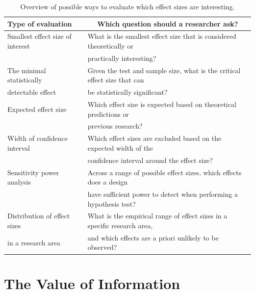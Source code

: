 \documentclass[
  english,
  ,jou, a4paper,floatsintext]{apa6}
\begin{document}
\begin{table}[tbp]

\begin{center}
\begin{threeparttable}

\caption{\label{tab:table-effect-eval}Overview of possible ways to evaluate which effect sizes are interesting.}

\begin{tabular}{ll}
\toprule
Type of evaluation & \multicolumn{1}{c}{Which question should a researcher ask?}\\
\midrule
Smallest effect size of interest & What is the smallest effect size that is considered theoretically or\\
 & practically interesting?\\ \midrule
The minimal statistically & Given the test and sample size, what is the critical effect size that can\\
detectable effect & be statistically significant?\\ \midrule
Expected effect size & Which effect size is expected based on theoretical predictions or\\
 & previous research?\\ \midrule
Width of confidence interval & Which effect sizes are excluded based on the expected width of the\\
 & confidence interval around the effect size?\\ \midrule
Sensitivity power analysis & Across a range of possible effect sizes, which effects does a design\\
 & have sufficient power to detect when performing a hypothesis test?\\ \midrule
Distribution of effect sizes & What is the empirical range of effect sizes in a specific research area,\\
in a research area & and which effects are a priori unlikely to be observed?\\
\bottomrule
\end{tabular}

\end{threeparttable}
\end{center}

\end{table}

\hypertarget{the-value-of-information}{%
\section{The Value of Information}\label{the-value-of-information}}
\end{document}

